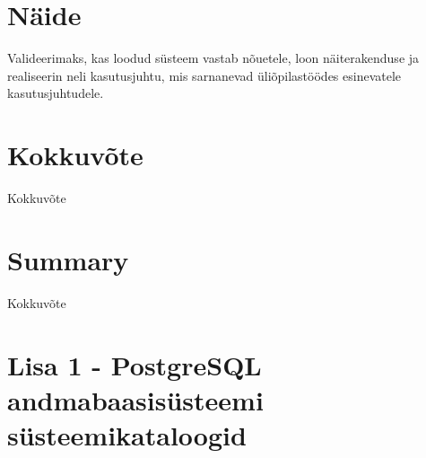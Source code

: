 \documentclass[a4paper,12pt]{article} %
\begin{document}
\section{Näide}
Valideerimaks, kas loodud süsteem vastab nõuetele, loon näiterakenduse ja realiseerin neli kasutusjuhtu, mis sarnanevad üliõpilastöödes esinevatele kasutusjuhtudele.

\section{Kokkuvõte}
Kokkuvõte

\pagebreak

\section{Summary}
Kokkuvõte

\pagebreak




\pagebreak

\section*{Lisa 1 - PostgreSQL andmabaasisüsteemi süsteemikataloogid}
\label{lisa1}
\end{document}
